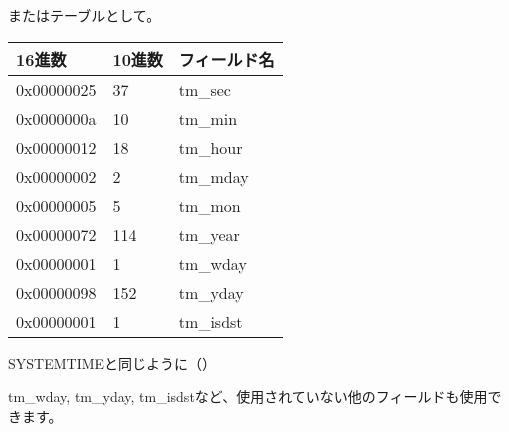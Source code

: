 またはテーブルとして。

\begin{center}
\begin{tabular}{ | l | l | l | }
\hline
\headercolor{} 16進数 & 
\headercolor{} 10進数 & 
\headercolor{} フィールド名 \\
\hline
0x00000025 & 37 	& tm\_sec \\
\hline
0x0000000a & 10 	& tm\_min \\
\hline
0x00000012 & 18 	& tm\_hour \\	
\hline
0x00000002 & 2 		& tm\_mday \\	
\hline
0x00000005 & 5 		& tm\_mon \\	
\hline
0x00000072 & 114 	& tm\_year \\
\hline
0x00000001 & 1 		& tm\_wday \\	
\hline
0x00000098 & 152 	& tm\_yday \\	
\hline
0x00000001 & 1 		& tm\_isdst \\
\hline
\end{tabular}
\end{center}

SYSTEMTIMEと同じように（）

tm\_wday, tm\_yday, tm\_isdstなど、使用されていない他のフィールドも使用できます。
